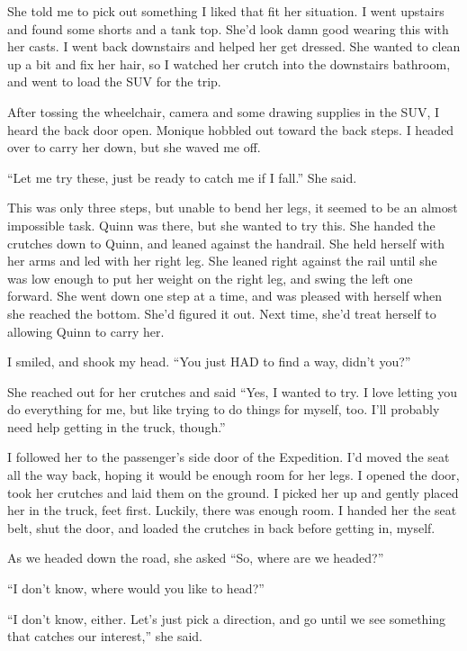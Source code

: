 She told me to pick out something I liked that fit her situation. I went upstairs and found
some shorts and a tank top. She'd look damn good wearing this with her casts. I went back
downstairs and helped her get dressed. She wanted to clean up a bit and fix her hair, so I
watched her crutch into the downstairs bathroom, and went to load the SUV for the trip.

After tossing the wheelchair, camera and some drawing supplies in the SUV, I heard the back
door open. Monique hobbled out toward the back steps. I headed over to carry her down, but she
waved me off.

``Let me try these, just be ready to catch me if I fall.'' She said.

\begin{thought}
This was only three steps, but unable to bend her legs, it seemed to be an almost
impossible task. Quinn was there, but she wanted to try this. She handed the crutches down to
Quinn, and leaned against the handrail. She held herself with her arms and led with her right
leg. She leaned right against the rail until she was low enough to put her weight on the right
leg, and swing the left one forward. She went down one step at a time, and was pleased with
herself when she reached the bottom. She'd figured it out. Next time, she'd treat herself to
allowing Quinn to carry her.
\end{thought}

I smiled, and shook my head. ``You just HAD to find a way, didn't you?''

She reached out for her crutches and said ``Yes, I wanted to try. I love letting you do
everything for me, but like trying to do things for myself, too. I'll probably need help getting
in the truck, though.''

I followed her to the passenger's side door of the Expedition. I'd moved the seat all the
way back, hoping it would be enough room for her legs. I opened the door, took her crutches and
laid them on the ground. I picked her up and gently placed her in the truck, feet first.
Luckily, there was enough room. I handed her the seat belt, shut the door, and loaded the
crutches in back before getting in, myself.

As we headed down the road, she asked ``So, where are we headed?''

``I don't know, where would you like to head?''

``I don't know, either. Let's just pick a direction, and go until we see something that
catches our interest,'' she said.


